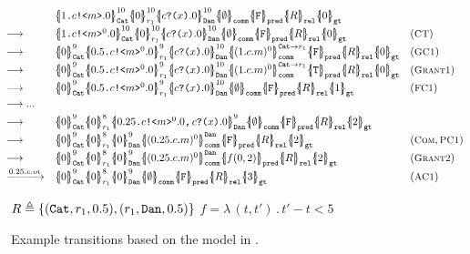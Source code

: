 \begin{figure}[t]
{\footnotesize
\[\hspace*{-1em}
\begin{array}{lll}
&
\pcellb{\qsend{1}{c}{m}.0}{10}{\cn{Cat}}
\pcellb{0}{10}{r_1}
\pcellb{\qrev{c}{x}.0}{10}{\cn{Dan}} 
\qcellb{\emptyset}{\cn{comm}}
\qcellb{\texttt{F}}{\cn{pred}}
\qcellb{R}{\cn{rel}}
\qcellb{0}{\cn{gt}}
&
\\[0.3em]
\longrightarrow
&
\pcellb{\qsend{1}{c}{m}^0.0}{10}{\cn{Cat}}
\pcellb{0}{10}{r_1}
\pcellb{\qrev{c}{x}.0}{10}{\cn{Dan}} 
\qcellb{\emptyset}{\cn{comm}}
\qcellb{\texttt{F}}{\cn{pred}}
\qcellb{R}{\cn{rel}}
\qcellb{0}{\cn{gt}}
&
(\rulelab{CT})
\\[0.3em]
\longrightarrow
&
\pcellb{0}{9}{\cn{Cat}}
\pcellb{\qsend{0.5}{c}{m}^0.0}{9}{r_1}
\pcellb{\qrev{c}{x}.0}{10}{\cn{Dan}} 
\pcellb{(1.c.m)^0}{\cn{Cat}\rightarrow r_1}{\cn{comm}}
\qcellb{\texttt{F}}{\cn{pred}}
\qcellb{R}{\cn{rel}}
\qcellb{0}{\cn{gt}}
&
(\rulelab{GC1})
\\[0.3em]
\longrightarrow
&
\pcellb{0}{9}{\cn{Cat}}
\pcellb{\qsend{0.5}{c}{m}^0.0}{9}{r_1}
\pcellb{\qrev{c}{x}.0}{10}{\cn{Dan}} 
\pcellb{(1.c.m)^0}{\cn{Cat}\rightarrow r_1}{\cn{comm}}
\qcellb{\texttt{T}}{\cn{pred}}
\qcellb{R}{\cn{rel}}
\qcellb{0}{\cn{gt}}
&
(\rulelab{Grant1})
\\[0.3em]
\longrightarrow
&
\pcellb{0}{9}{\cn{Cat}}
\pcellb{\qsend{0.5}{c}{m}^0.0}{9}{r_1}
\pcellb{\qrev{c}{x}.0}{10}{\cn{Dan}} 
\qcellb{\emptyset}{\cn{comm}}
\qcellb{\texttt{F}}{\cn{pred}}
\qcellb{R}{\cn{rel}}
\qcellb{1}{\cn{gt}}
&
(\rulelab{FC1})
\\[0.3em]
\longrightarrow ...
\\[0.3em]
\longrightarrow
&
\pcellb{0}{9}{\cn{Cat}}
\pcellb{0}{8}{r_1}
\pcellb{\pard{\qsend{0.25}{c}{m}^0.0}{\qrev{c}{x}.0}}{9}{\cn{Dan}} 
\qcellb{\emptyset}{\cn{comm}}
\qcellb{\texttt{F}}{\cn{pred}}
\qcellb{R}{\cn{rel}}
\qcellb{2}{\cn{gt}}
&
\\[0.3em]
\longrightarrow
&
\pcellb{0}{9}{\cn{Cat}}
\pcellb{0}{8}{r_1}
\pcellb{0}{9}{\cn{Dan}} 
\pcellb{(0.25.c.m)^0}{\cn{Dan}}{\cn{comm}}
\qcellb{\texttt{F}}{\cn{pred}}
\qcellb{R}{\cn{rel}}
\qcellb{2}{\cn{gt}}
&
(\rulelab{Com},\rulelab{PC1})
\\[0.3em]
\longrightarrow
&
\pcellb{0}{9}{\cn{Cat}}
\pcellb{0}{8}{r_1}
\pcellb{0}{9}{\cn{Dan}} 
\pcellb{(0.25.c.m)^0}{\cn{Dan}}{\cn{comm}}
\qcellb{f(0,2)}{\cn{pred}}
\qcellb{R}{\cn{rel}}
\qcellb{2}{\cn{gt}}
&
(\rulelab{Grant2})
\\[0.3em]
\xrightarrow{0.25.c.m}&
\pcellb{0}{9}{\cn{Cat}}
\pcellb{0}{8}{r_1}
\pcellb{0}{9}{\cn{Dan}} 
\qcellb{\emptyset}{\cn{comm}}
\qcellb{\texttt{F}}{\cn{pred}}
\qcellb{R}{\cn{rel}}
\qcellb{3}{\cn{gt}}
&
(\rulelab{AC1})
\end{array}
\]
}
{\footnotesize
\begin{center}
$R\triangleq\{(\texttt{Cat},r_1,0.5), (r_1,\texttt{Dan},0.5)\}$
\qquad
$f=\lambda\,(t,t')\,.\,t'-t<5$
\end{center}
}
\caption{Example transitions based on the model in .}
  \label{fig:q-pi-example1}
\end{figure}


